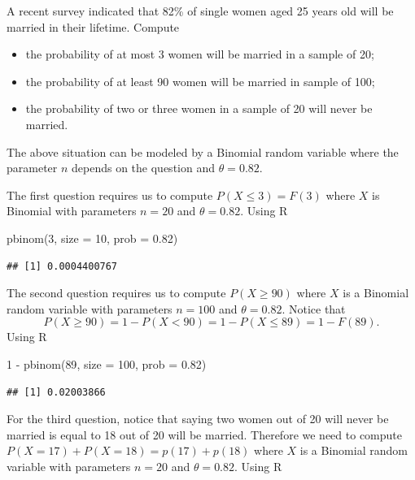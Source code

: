 \documentclass[
]{book}
\newenvironment{Shaded}{\begin{snugshade}}{\end{snugshade}}
\newcommand{\AttributeTok}[1]{\textcolor[rgb]{0.77,0.63,0.00}{#1}}
\newcommand{\DecValTok}[1]{\textcolor[rgb]{0.00,0.00,0.81}{#1}}
\newcommand{\FloatTok}[1]{\textcolor[rgb]{0.00,0.00,0.81}{#1}}
\newcommand{\FunctionTok}[1]{\textcolor[rgb]{0.00,0.00,0.00}{#1}}
\newcommand{\NormalTok}[1]{#1}
\newcommand{\SpecialCharTok}[1]{\textcolor[rgb]{0.00,0.00,0.00}{#1}}
\theoremstyle{definition}
\theoremstyle{definition}
\theoremstyle{definition}
\theoremstyle{definition}
\theoremstyle{remark}
\begin{document}
A recent survey indicated that 82\% of single women aged 25 years old will be married in their lifetime. Compute

\begin{itemize}
\item
  the probability of at most 3 women will be married in a sample of 20;
\item
  the probability of at least 90 women will be married in sample of 100;
\item
  the probability of two or three women in a sample of 20 will never be married.
\end{itemize}

The above situation can be modeled by a Binomial random variable where the parameter \(n\) depends on the question and \(\theta = 0.82\).

The first question requires us to compute \(P(X\leq 3)= F(3)\) where \(X\) is Binomial with parameters \(n=20\) and \(\theta =0.82\). Using R

\begin{Shaded}
\begin{Highlighting}[]
\FunctionTok{pbinom}\NormalTok{(}\DecValTok{3}\NormalTok{, }\AttributeTok{size =} \DecValTok{10}\NormalTok{, }\AttributeTok{prob =} \FloatTok{0.82}\NormalTok{)}
\end{Highlighting}
\end{Shaded}

\begin{verbatim}
## [1] 0.0004400767
\end{verbatim}

The second question requires us to compute \(P(X\geq 90)\) where \(X\) is a Binomial random variable with parameters \(n=100\) and \(\theta = 0.82\). Notice that
\[
P(X\geq 90) = 1 - P(X< 90) = 1 - P(X\leq 89) = 1 - F(89).
\]
Using R

\begin{Shaded}
\begin{Highlighting}[]
\DecValTok{1} \SpecialCharTok{{-}} \FunctionTok{pbinom}\NormalTok{(}\DecValTok{89}\NormalTok{, }\AttributeTok{size =} \DecValTok{100}\NormalTok{,  }\AttributeTok{prob =} \FloatTok{0.82}\NormalTok{)}
\end{Highlighting}
\end{Shaded}

\begin{verbatim}
## [1] 0.02003866
\end{verbatim}

For the third question, notice that saying two women out of 20 will never be married is equal to 18 out of 20 will be married. Therefore we need to compute \(P(X=17) + P(X=18)= p(17) + p(18)\) where \(X\) is a Binomial random variable with parameters \(n=20\) and \(\theta = 0.82\). Using R
\end{document}
